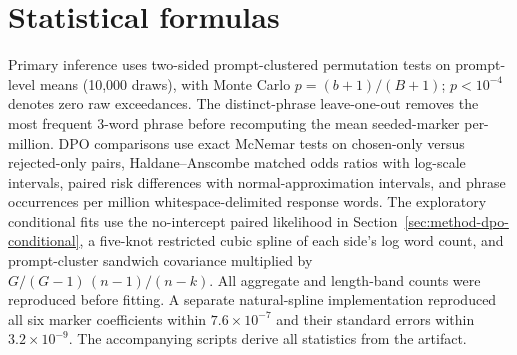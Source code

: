 \documentclass[11pt]{article}
\begin{document}
\section{Statistical formulas}
\label{app:formulas}

Primary inference uses two-sided prompt-clustered permutation tests on
prompt-level means (10{,}000 draws), with Monte Carlo
$p=(b+1)/(B+1)$; $p<10^{-4}$ denotes zero raw exceedances.
The distinct-phrase leave-one-out removes the most frequent 3-word phrase before
recomputing the mean seeded-marker per-million. DPO comparisons use exact McNemar
tests on chosen-only versus rejected-only pairs, Haldane--Anscombe matched odds
ratios with log-scale intervals, paired risk differences with normal-approximation
intervals, and phrase occurrences per million whitespace-delimited response
words. The exploratory conditional fits use the no-intercept paired likelihood
in Section~\ref{sec:method-dpo-conditional}, a five-knot restricted cubic spline of each
side's log word count, and prompt-cluster sandwich covariance multiplied by
$G/(G-1)\,(n-1)/(n-k)$. All aggregate and length-band counts were reproduced
before fitting. A separate natural-spline implementation reproduced all six
marker coefficients within $7.6\times10^{-7}$ and their standard errors within
$3.2\times10^{-9}$. The accompanying scripts derive all statistics from the
artifact.
\end{document}
